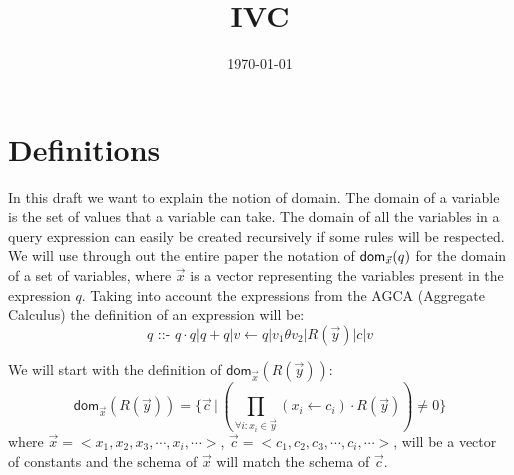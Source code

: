 \documentclass[12pt]{article}
\begin{document}
\title{IVC}
\author{}
\date{\today}
\maketitle
\newcommand{\dom}{\textsf{dom}}

\section{Definitions}
In this draft we want to explain the notion of domain. The domain of a variable is the set of values that a variable can take. The domain of all the variables in a query expression can easily be created recursively if some rules will be respected. We will use through out the entire paper the notation of $\text{\dom{}}_{\vec x}(q)$ for the domain of a set of variables, where $\vec x$ is a vector representing the variables present in the expression $q$. Taking into account the expressions from the AGCA (Aggregate Calculus\cite{1}) the definition of an expression will be: 
$$q\text{ ::- }q\cdot q | q + q|v \gets q |v_{1}\theta v_{2}|R(\vec{y})|c|v$$

We will start with the definition of $\dom{}_{\vec x}(R(\vec y))$:
$$\dom{}_{\vec x}(R(\vec y))=\bigg\{\vec c\,|\,(\prod\limits_{\forall i:x_{i}\in \vec y}^{}(x_{i}\gets c_{i})\cdot R(\vec y))\not= 0\bigg\} $$where $\vec x=<x_1,x_2,x_3,\cdots,x_i,\cdots>$, $\vec c=<c_1,c_2,c_3,\cdots,c_i,\cdots>$,  will be a vector of constants and the schema of $\vec x$ will match the schema of $\vec c$. \par
\end{document}
